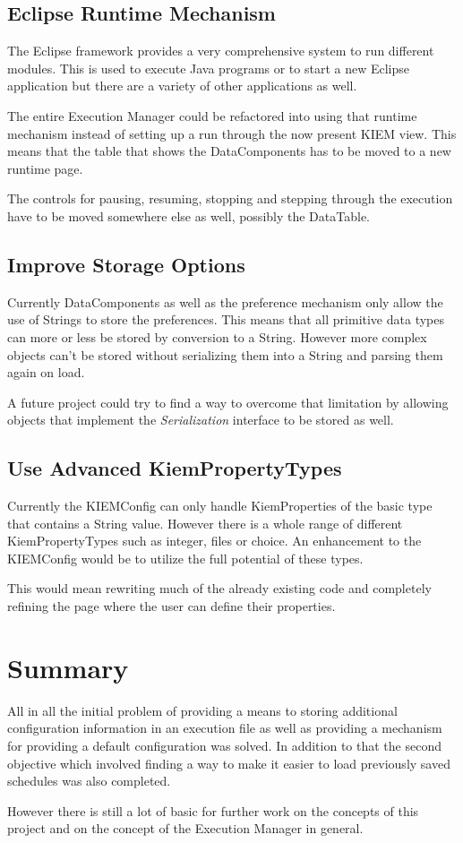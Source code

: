\subsection{Eclipse Runtime Mechanism}
The Eclipse framework provides a very comprehensive system to run different
modules. This is used to execute Java programs or to start a new Eclipse application
but there are a variety of other applications as well.

The entire Execution Manager could be refactored into using that runtime mechanism instead
of setting up a run through the now present \ac{KIEM} view. This means that the table
that shows the DataComponents has to be moved to a new runtime page. 

The controls for pausing, resuming, stopping and stepping through the execution have to
be moved somewhere else as well, possibly the DataTable.

\subsection{Improve Storage Options}
Currently DataComponents as well as the preference mechanism only allow the use of
Strings to store the preferences. This means that all primitive data types can more
or less be stored by conversion to a String. However more complex objects can't be stored
without serializing them into a String and parsing them again on load.

A future project could try to find a way to overcome that limitation by allowing
objects that implement the \textit{Serialization} interface to be stored as well.

\subsection{Use Advanced KiemPropertyTypes}
Currently the \ac{KIEMConfig} can only handle KiemProperties of the basic type that
contains a String value. However there is a whole range of different KiemPropertyTypes
such as integer, files or choice. An enhancement to the \ac{KIEMConfig} would be to
utilize the full potential of these types.

This would mean rewriting much of the already existing code and completely refining
the page where the user can define their properties.

\section{Summary}
All in all the initial problem of providing a means to storing additional configuration information
in an execution file as well as providing a mechanism for providing a default configuration was solved. 
In addition to that the second objective which involved finding a way to make it easier to load previously
saved schedules was also completed.

However there is still a lot of basic for further work on the concepts of this project and on the
concept of the Execution Manager in general.
